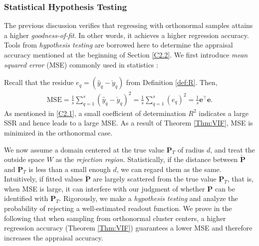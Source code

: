 \subsubsection{Statistical Hypothesis Testing}\label{C2.3}

The previous discussion verifies that regressing with orthonormal samples attains a higher \emph{goodness-of-fit}. In other words, it achieves a higher regression accuracy. Tools from \emph{hypothesis testing} are borrowed here to determine the appraisal accuracy mentioned at the beginning of Section \ref{C2.2}. We first introduce \emph{mean squared error} (MSE) commonly used in statistics \cite{DeGroot2012}:

\begin{definition}
\label{remarkMSE}
     Recall that the residue $e_{q} = (\hat{y}_q-\check{y}_q)$ from Definition \ref{def:R}. Then,
	\begin{align}
		\text{MSE} = \frac{1}{s}\sum_{q=1}^s(\hat{y}_q-\check{y}_q)^2 = \frac{1}{s}\sum_{q=1}^s(e_q)^2=\frac{1}{s}\bm e^{\top}\bm e.
	\end{align}
	As mentioned in \ref{C2.1}, a small coefficient of determination $R^2$ indicates a large SSR and hence leads to a large MSE. As a result of Theorem \ref{Thm:VIF}, MSE is minimized in the orthonormal case.
\end{definition}

We now assume a domain centered at the true value $\bm P_T$ of radius $d$, and treat the outside space $W$ as the \emph{rejection region}. Statistically, if the distance between $\check{\bm P}$ and $\bm P_T$ is less than a small enough $d$, we can regard them as the same. Intuitively, if fitted values $\check{\bm P}$ are largely scattered from the true value $\bm P_T$, that is, when MSE is large, it 
can interfere with our judgment of whether $\bm P$ can be identified with $\bm P_T$. Rigorously, we make a \emph{hypothesis testing} and analyze the probability of rejecting a well-estimated readout function. We prove in the following that when sampling from orthonormal cluster centers, a higher regression accuracy (Theorem \ref{Thm:VIF}) guarantees a lower MSE and therefore increases the appraisal accuracy.

